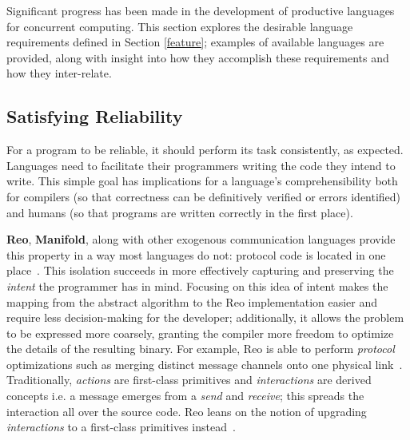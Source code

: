 Significant progress has been made in the development of productive languages for concurrent computing. This section explores the desirable language requirements defined in Section \ref{feature}; examples of available languages are provided, along with insight into how they accomplish these requirements and how they inter-relate.

\subsection{Satisfying Reliability}
\label{sec:how:reliability}
For a program to be reliable, it should perform its task consistently, as expected. Languages need to facilitate their programmers writing the code they intend to write. This simple goal has implications for a language's comprehensibility both for compilers (so that correctness can be definitively verified or errors identified) and humans (so that programs are written correctly in the first place).

\textbf{Reo}, \textbf{Manifold}, along with other exogenous communication languages provide this property in a way most languages do not: protocol code is located in one place~\cite{proper}. This isolation succeeds in more effectively capturing and preserving the \textit{intent} the programmer has in mind. Focusing on this idea of intent makes the mapping from the abstract algorithm to the Reo implementation easier and require less decision-making for the developer; additionally, it allows the problem to be expressed more coarsely, granting the compiler more freedom to optimize the details of the resulting binary. For example, Reo is able to perform \textit{protocol} optimizations such as merging distinct message channels onto one physical link~\cite{reoLinda}. Traditionally, \textit{actions} are first-class primitives and \textit{interactions} are derived concepts i.e. a message emerges from a \textit{send} and \textit{receive}; this spreads the interaction all over the source code.
Reo leans on the notion of upgrading \textit{interactions} to a first-class primitives instead~\cite{introReo}.

